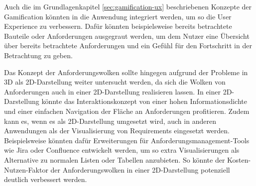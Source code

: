 Auch die im Grundlagenkapitel \ref{sec:gamification-ux} beschriebenen Konzepte der Gamification könnten in die Anwendung integriert werden, um so die User Experience zu verbessern.
Dafür könnten beispielsweise bereits betrachtete Bauteile oder Anforderungen ausgegraut werden, um dem Nutzer eine Übersicht über bereits betrachtete Anforderungen und ein Gefühl für den \glqq{}Fortschritt\grqq{} in der Betrachtung zu geben.

Das Konzept der Anforderungswolken sollte hingegen aufgrund der Probleme in 3D als 2D-Darstellung weiter untersucht werden, da sich die Wolken von Anforderungen auch in einer 2D-Darstellung realisieren lassen.
In einer 2D-Darstellung könnte das Interaktionskonzept von einer hohen Informationsdichte und einer einfachen Navigation der Fläche an Anforderungen profitieren.
Zudem kann es, wenn es als 2D-Darstellung umgesetzt wird, auch in anderen Anwendungen als der Visualisierung von Requirements eingesetzt werden.
Beispielsweise könnten dafür Erweiterungen für Anforderungsmanagement-Tools wie Jira oder Confluence entwickelt werden, um so extra Visualisierungen als Alternative zu normalen Listen oder Tabellen anzubieten.
So könnte der Kosten-Nutzen-Faktor der Anforderungswolken in einer 2D-Darstellung potenziell deutlich verbessert werden.